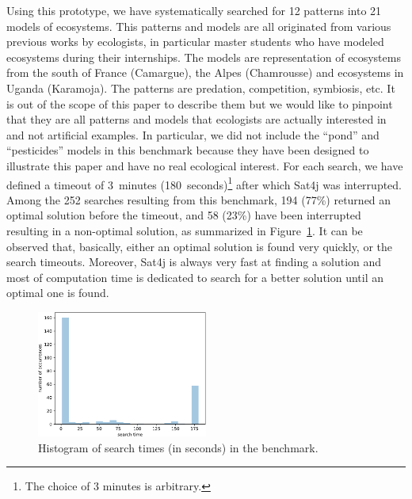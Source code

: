 \documentclass[a4paper,twoside]{article}
\begin{document}
Using this prototype, we have systematically searched for 12 patterns into 21 models of ecosystems.
This patterns and models are all originated from various previous works by ecologists, in particular master students who have modeled ecosystems during their internships. The  models are representation of ecosystems from the south of France (Camargue), the Alpes (Chamrousse) and ecosystems in Uganda (Karamoja). The patterns are predation, competition, symbiosis, etc.
It is out of the scope of this paper to describe them but we would like to pinpoint that they are all patterns and models that ecologists are actually interested in and not artificial examples.
In particular, we did not include the ``pond'' and ``pesticides'' models in this benchmark because they have been designed to illustrate this paper and have no real ecological interest.
For each search, we have defined a timeout of 3~minutes (180~seconds)\footnote{The choice of 3 minutes is arbitrary.} after which Sat4j was interrupted.
Among the 252 searches resulting from this benchmark, 194 (77\%) returned an optimal solution before the timeout, and 58 (23\%) have been interrupted resulting in a non-optimal solution, as summarized in Figure~\ref{fig:histo}.
It can be observed that, basically, either an optimal solution is found very quickly, or the search timeouts.
Moreover, Sat4j is always very fast at finding a solution and most of computation time is dedicated to search for a better solution until an optimal one is found.

\begin{figure}[t]
  \begin{center}
    \includegraphics[width=0.5\textwidth]{histogram}
  \end{center}
 
  \caption{Histogram of search times (in seconds) in the benchmark.}
  \label{fig:histo}
\end{figure}
\end{document}
